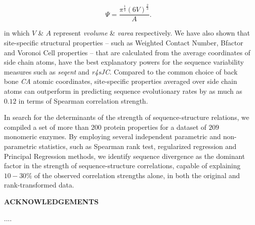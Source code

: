 \documentclass[11pt]{article}
\def\Acknowledgements{\bigskip  \bigskip \begin{center} \begin{large}
             \bf ACKNOWLEDGEMENTS \end{large}\end{center}}
\begin{document}
        \begin{equation}
        \label{eqn:sphericity}
        \Psi = \frac{\pi^{\frac{1}{3}}(6V)^{\frac{2}{3}}}{A}.
        \end{equation}

        in which $V$ \& $A$ represent {\it vvolume} \& {\it varea} respectively. We have also shown that site-specific structural properties -- such as Weighted Contact Number, Bfactor and Voronoi Cell properties -- that are calculated from the average coordinates of side chain atoms, have the best explanatory powers for the sequence variability measures such as {\it seqent} and {\it r4sJC}. Compared to the common choice of back bone {\it CA} atomic coordinates, site-specific properties averaged over side chain atoms can outperform in predicting sequence evolutionary rates by as much as $0.12$ in terms of Spearman correlation strength.

        In search for the determinants of the strength of sequence-structure relations, we compiled a set of more than $200$ protein properties for a dataset of $209$ monomeric enzymes. By employing several independent parametric and non-parametric statistics, such as Spearman rank test, regularized regression and Principal Regression methods, we identify sequence divergence as the dominant factor in the strength of sequence-structure correlations, capable of explaining $10-30\%$ of the observed correlation strengths alone, in both the original and rank-transformed data.


\Acknowledgements

....




\end{document}
